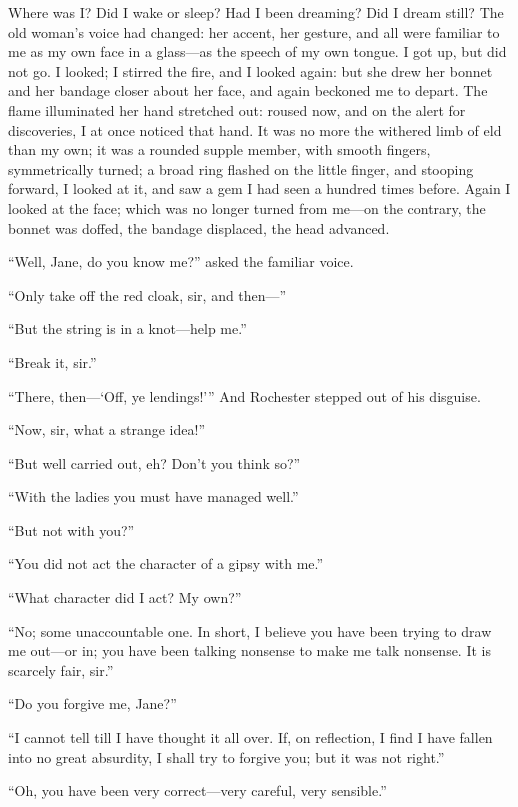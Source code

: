 Where was I? Did I wake or sleep? Had I been dreaming? Did I dream
still? The old woman's voice had changed: her accent, her gesture, and
all were familiar to me as my own face in a glass---as the speech of my
own tongue. I got up, but did not go. I looked; I stirred the fire,
and I looked again: but she drew her bonnet and her bandage closer about
her face, and again beckoned me to depart. The flame illuminated her
hand stretched out: roused now, and on the alert for discoveries, I at
once noticed that hand. It was no more the withered limb of eld than my
own; it was a rounded supple member, with smooth fingers, symmetrically
turned; a broad ring flashed on the little finger, and stooping forward,
I looked at it, and saw a gem I had seen a hundred times before. Again
I looked at the face; which was no longer turned from me---on the
contrary, the bonnet was doffed, the bandage displaced, the head
advanced.

\enquote{Well, Jane, do you know me?} asked the familiar voice.

\enquote{Only take off the red cloak, sir, and then---}

\enquote{But the string is in a knot---help me.}

\enquote{Break it, sir.}

\enquote{There, then---\enquote{Off, ye lendings!}} And \Mr{} Rochester stepped
out of his disguise.

\enquote{Now, sir, what a strange idea!}

\enquote{But well carried out, eh? Don't you think so?}

\enquote{With the ladies you must have managed well.}

\enquote{But not with you?}

\enquote{You did not act the character of a gipsy with me.}

\enquote{What character did I act? My own?}

\enquote{No; some unaccountable one. In short, I believe you have been
trying to draw me out---or in; you have been talking nonsense to make me
talk nonsense. It is scarcely fair, sir.}

\enquote{Do you forgive me, Jane?}

\enquote{I cannot tell till I have thought it all over. If, on
reflection, I find I have fallen into no great absurdity, I shall try to
forgive you; but it was not right.}

\enquote{Oh, you have been very correct---very careful, very sensible.}

